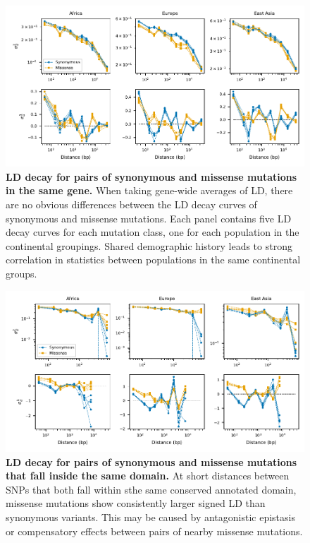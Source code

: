 \documentclass[]{article}
\begin{document}
\begin{figure}[ht!]
    \centering
    \includegraphics{../figures/ld_decay_gene_wide}
    \caption{
        \textbf{LD decay for pairs of synonymous and missense mutations
        in the same gene.}
        When taking gene-wide averages of LD, there are no obvious differences
        between the LD decay curves of synonymous and missense mutations.
        Each panel contains five LD decay curves for each mutation class, one for
        each \citet{1000_Genomes_Project_Consortium2015-zq} population in the
        continental groupings. Shared demographic history leads to strong
        correlation in statistics between populations in the same continental
        groups.
    }
    \label{fig:LDgene}
\end{figure}

\begin{figure}[ht!]
    \centering
    \includegraphics{../figures/ld_decay_in_domain}
    \caption{
        \textbf{LD decay for pairs of synonymous and missense mutations
        that fall inside the same domain.}
        At short distances between SNPs that both fall within sthe same conserved
        annotated domain, missense mutations show consistently
        larger signed LD than synonymous variants. This may be caused by
        antagonistic epistasis or compensatory effects between pairs of
        nearby missense mutations.
    }
    \label{fig:LDwithin}
\end{figure}
\end{document}
